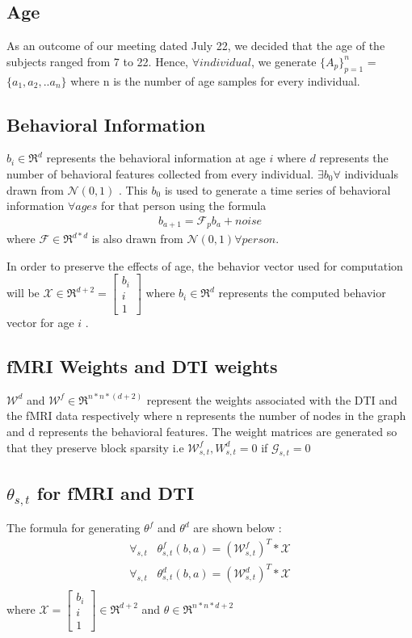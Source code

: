 \documentclass[a4paper,10pt]{article}
\begin{document}
\subsection{Age}
As an outcome of our meeting dated July 22, we decided that the age of the subjects ranged from 7 to 22. Hence, $\forall individual$, we generate $\{A_{p}\}_{p=1}^{n}$ = $\{a_{1},a_{2}, .. a_{n}\}$ where n is the number of age samples for every individual.
\subsection{Behavioral Information}
$b_{i} \in \Re^{d}$ represents the behavioral information at age $i$ where $d$ represents the number of behavioral features collected from every individual. $\exists b_{0} \forall$ individuals drawn from $\mathcal{N}(0,1)$ . This $b_{0}$ is used to generate a time series of behavioral information $\forall ages$ for that person using the formula
\begin{align*}
b_{a+1}=\mathcal{F}_{p}b_{a} + noise
\end{align*}
where $\mathcal{F} \in \Re^{d*d}$ is also drawn from $\mathcal{N}(0,1) \forall person$.  

In order to preserve the effects of age, the behavior vector used for computation will be $\mathcal{X} \in \Re^{d+2} = \begin{bmatrix}
      b_{i} \\
      i \\
      1
    \end{bmatrix}$ where $b_{i} \in \Re^{d}$ represents the computed behavior vector for age $i$ . 
\subsection{fMRI Weights and DTI weights}
$\mathcal{W}^{d}$ and $\mathcal{W}^{f} \in \Re^{n*n*(d+2)}$  represent the weights associated with the DTI and the fMRI data respectively where n represents the number of nodes in the graph and d represents the behavioral features. The weight matrices are generated so that they preserve block sparsity i.e $\mathcal{W}^{f}_{s,t},{W}^{d}_{s,t}=0$ if $\mathcal{G}_{s,t}=0$
\subsection{$\theta_{s,t}$ for fMRI and DTI}
The formula for generating $\theta^{f}$ and $\theta^{d}$ are shown below :
\begin{align*}
\forall _{s,t} \hspace{10pt} \theta^{f}_{s,t}(b,a)= (\mathcal{W}^f_{s,t})^T * \mathcal{X} \\
\forall _{s,t} \hspace{10pt} \theta^{d}_{s,t}(b,a)= (\mathcal{W}^d_{s,t})^T * \mathcal{X} \\
\end{align*}
where $\mathcal{X} =
\begin{bmatrix}
      b_{i} \\
      i \\
      1
    \end{bmatrix} \in \Re^{d+2}$ and $\theta \in \Re^{n*n*d+2}$
\end{document}
